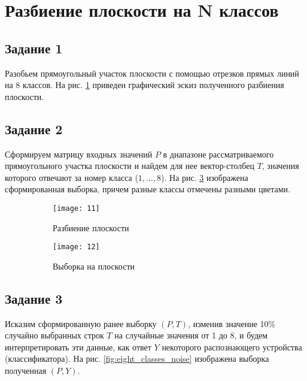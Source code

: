 \newpage

\section{Разбиение плоскости на N классов}

\subsection{Задание 1}

Разобьем прямоугольный участок плоскости с помощью отрезков прямых линий на 8 классов. На рис. \ref{fig:eight_classes_plane_splitting} приведен графический эскиз полученного разбиения плоскости.

\subsection{Задание 2}

Сформируем матрицу входных значений $P$ в диапазоне рассматриваемого прямоугольного участка плоскости и найдем для нее вектор-столбец $T$, значения которого отвечают за номер класса ($1,\dotsc ,8$). На рис. \ref{fig:eight_classes_sample} изображена сформированная выборка, причем разные классы отмечены разными цветами.

\begin{figure}[H]
\begin{center}
	\begin{subfigure}[b]{0.49\textwidth}
		\texttt{[image: 11]}
		\caption{Разбиение плоскости}
		\label{fig:eight_classes_plane_splitting}
	\end{subfigure}
	\begin{subfigure}[b]{0.49\textwidth}
		\texttt{[image: 12]}
		\caption{Выборка на плоскости}
		\label{fig:eight_classes_sample}
	\end{subfigure}
	\caption{}
\end{center}
\end{figure}
\vspace{-1.5cm}

\subsection{Задание 3}

Исказим сформированную ранее выборку $(P, T)$, изменив значение 10\% случайно выбранных строк $T$ на случайные значения от 1 до 8, и будем интерпретировать эти данные, как ответ $Y$ некоторого распознающего устройства (классификатора). На рис. \ref{fig:eight_classes_noise} изображена выборка полученная $(P, Y)$.

